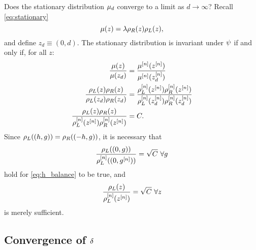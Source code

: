 \documentclass[twocolumn]{article}
\begin{document}
Does the stationary distribution $\mu_d$ converge to a limit
as $d \rightarrow \infty$?
Recall \eqref{eq:stationary}
\begin{equation*}
  \mu(z) = \lambda \rho_R(z) \rho_L(z),
\end{equation*}
and define $z_d \equiv (0,d)$.  The stationary distribution is
invariant under $\psi_{}$ if and only if, for all $z$:
\begin{align}
  \frac{\stationary(z)}{\stationary(z_d)} &=
  \frac{\stationary\supn(z\supn)}{\stationary\supn(z\supn_d)} \nonumber\\
%
  \frac{\lefunc(z)\refunc(z)}{\lefunc(z_d)\refunc(z_d)} &=
  \frac{\lefunc\supn(z\supn)\refunc\supn(z\supn)}
       {\lefunc\supn(z_d\supn)\refunc\supn(z_d\supn)}
  \nonumber \\ 
  \label{eq:h_balance}
  \frac{\lefunc(z)\refunc(z)}
       {\lefunc\supn(z\supn)\refunc\supn(z\supn)} &= C.
\end{align}
Since $\rho_L((h,g)) = \rho_R((-h,g))$, it is necessary that
\begin{equation}
  \label{eq:h_zero}
  \frac{\rho_L((0,g))}{\rho_L^{[n]}((0,g^{[n]}))} = \sqrt{C} ~\forall g
\end{equation}
hold for \eqref{eq:h_balance} to be true, and
\begin{equation}
  \label{eq:h_any}
  \frac{\rho_L(z)}{\rho_L^{[n]}(z^{[n]})} = \sqrt{C} ~\forall z  
\end{equation}
is merely sufficient.

\subsection{Convergence of $\delta_{}$}
\label{sec:convergence_joint}
\end{document}
